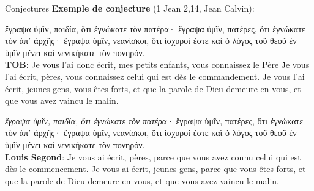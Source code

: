 \documentclass[11pt]{beamer}
\begin{document}
\begin{frame}{Conjectures}
    \textbf{Exemple de conjecture} (1 Jean 2,14, Jean Calvin):\\
        \begin{minipage}{.4\textwidth}
    \footnotesize
    \begin{exampleblock}{}
    \textgreek{ἔγραψα ὑμῖν, παιδία, ὅτι ἐγνώκατε τὸν πατέρα· ἔγραψα ὑμῖν, πατέρες, ὅτι ἐγνώκατε τὸν ἀπ᾽ ἀρχῆς· ἔγραψα ὑμῖν, νεανίσκοι, ὅτι ἰσχυροί ἐστε καὶ ὁ λόγος τοῦ θεοῦ ἐν ὑμῖν μένει καὶ νενικήκατε τὸν πονηρόν.}\\
    \textbf{TOB}: Je vous l'ai donc écrit, mes petits enfants, \og vous connaissez le Père \fg\.
    Je vous l'ai écrit, pères, \og vous connaissez celui qui est dès le commandement\fg. Je vous l'ai écrit, jeunes gens, \og vous êtes forts, et que la parole de Dieu demeure en vous, et que vous avez vaincu le malin\fg.\\
    \end{exampleblock}
    \end{minipage}%
    \hfill
    \begin{minipage}{.4\textwidth}
    \footnotesize
\textgreek{\emph{ἔγραψα ὑμῖν, παιδία, ὅτι ἐγνώκατε τὸν πατέρα·} ἔγραψα ὑμῖν, πατέρες, ὅτι ἐγνώκατε τὸν ἀπ᾽ ἀρχῆς· ἔγραψα ὑμῖν, νεανίσκοι, ὅτι ἰσχυροί ἐστε καὶ ὁ λόγος τοῦ θεοῦ ἐν ὑμῖν μένει καὶ νενικήκατε τὸν πονηρόν.}\\

\pause
    \textbf{Louis Segond}: Je vous ai écrit, pères, parce que vous avez connu celui qui est dès le commencement. Je vous ai écrit, jeunes gens, parce que vous êtes forts, et que la parole de Dieu demeure en vous, et que vous avez vaincu le malin.\\
    \end{minipage}
    
\end{frame}
\end{document}
